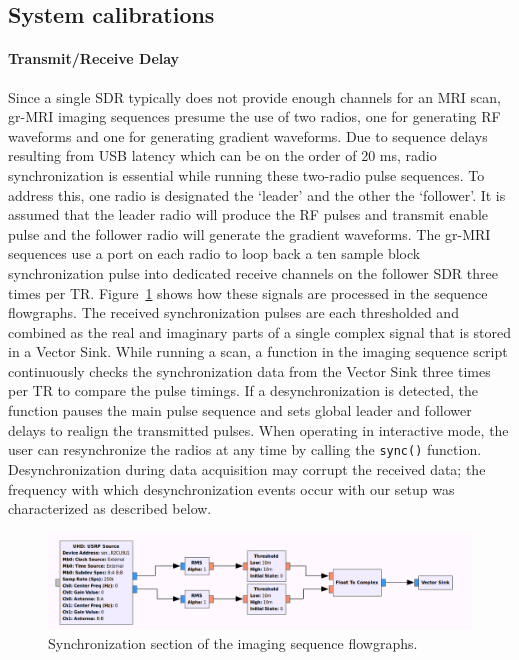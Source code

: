 \documentclass[review]{elsarticle}
\begin{document}
\subsection{System calibrations}

\paragraph{Transmit/Receive Delay} 
Since a single SDR typically does not provide enough channels for an MRI scan, 
gr-MRI imaging sequences presume the use of two radios, 
one for generating RF waveforms and one for generating gradient waveforms. 
Due to sequence delays resulting from USB latency which can be on the order of 20 ms, 
radio synchronization is essential while running these two-radio pulse sequences.  
To address this, one radio is designated the `leader' and the other the `follower'.
It is assumed that the leader radio will produce the RF pulses and transmit enable 
pulse and the follower radio will generate the gradient waveforms.
The gr-MRI sequences use a port on each radio to loop back a ten sample block synchronization pulse into dedicated receive channels on the follower SDR three times per TR.
Figure~\ref{fig:syncflow} shows how these signals are processed in the sequence flowgraphs.
The received synchronization pulses are each thresholded 
and combined as the real and imaginary parts of a single complex signal that is stored in a Vector Sink.  
While running a scan, 
a function in the imaging sequence script continuously checks the synchronization data from the 
Vector Sink three times per TR to compare the pulse timings.
If a desynchronization is detected, 
the function pauses the main pulse sequence and 
sets global leader and follower delays to realign the transmitted pulses.
When operating in interactive mode, 
the user can resynchronize the radios at any time by calling the  \texttt{sync()} function.
Desynchronization during data acquisition may corrupt the received data; 
the frequency with which desynchronization events 
occur with our setup was characterized as described below.

\begin{figure}[ht]
\begin{center}
\includegraphics[width = \textwidth,trim=0 0 0 0,clip=false]{sync_flow.png}
\caption{Synchronization section of the imaging sequence flowgraphs.}
\label{fig:syncflow}
\end{center}
\end{figure}
\end{document}
